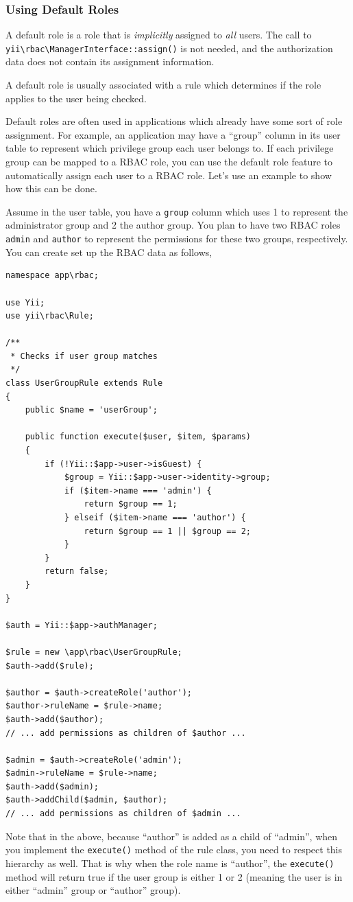 \subsubsection{Using Default Roles}
A default role is a role that is \textit{implicitly} assigned to \textit{all} users. The call to \texttt{yii{\allowbreak{}\textbackslash}rbac{\allowbreak{}\textbackslash}ManagerInterface\allowbreak{}::\allowbreak{}assign()}
is not needed, and the authorization data does not contain its assignment information.

A default role is usually associated with a rule which determines if the role applies to the user being checked.

Default roles are often used in applications which already have some sort of role assignment. For example, an application
may have a ``group'' column in its user table to represent which privilege group each user belongs to.
If each privilege group can be mapped to a RBAC role, you can use the default role feature to automatically
assign each user to a RBAC role. Let's use an example to show how this can be done.

Assume in the user table, you have a \lstinline|group| column which uses 1 to represent the administrator group and 2 the author group.
You plan to have two RBAC roles \lstinline|admin| and \lstinline|author| to represent the permissions for these two groups, respectively.
You can create set up the RBAC data as follows,

\lstset{language=php}\begin{lstlisting}
namespace app\rbac;

use Yii;
use yii\rbac\Rule;

/**
 * Checks if user group matches
 */
class UserGroupRule extends Rule
{
    public $name = 'userGroup';

    public function execute($user, $item, $params)
    {
        if (!Yii::$app->user->isGuest) {
            $group = Yii::$app->user->identity->group;
            if ($item->name === 'admin') {
                return $group == 1;
            } elseif ($item->name === 'author') {
                return $group == 1 || $group == 2;
            }
        }
        return false;
    }
}

$auth = Yii::$app->authManager;

$rule = new \app\rbac\UserGroupRule;
$auth->add($rule);

$author = $auth->createRole('author');
$author->ruleName = $rule->name;
$auth->add($author);
// ... add permissions as children of $author ...

$admin = $auth->createRole('admin');
$admin->ruleName = $rule->name;
$auth->add($admin);
$auth->addChild($admin, $author);
// ... add permissions as children of $admin ...
\end{lstlisting}
Note that in the above, because ``author'' is added as a child of ``admin'', when you implement the \lstinline|execute()| method
of the rule class, you need to respect this hierarchy as well. That is why when the role name is ``author'',
the \lstinline|execute()| method will return true if the user group is either 1 or 2 (meaning the user is in either ``admin''
group or ``author'' group).


